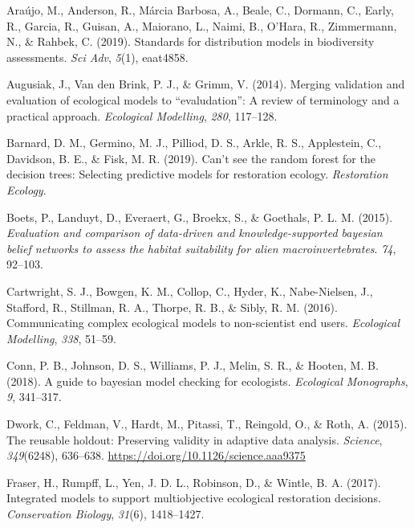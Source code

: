 \documentclass[
]{article}
\newlength{\cslhangindent}
\newenvironment{CSLReferences}[2] %
 {\begin{list}{}{%
  \setlength{\itemindent}{0pt}
  \setlength{\leftmargin}{0pt}
  \setlength{\parsep}{0pt}
  \ifodd #1
   \setlength{\leftmargin}{\cslhangindent}
   \setlength{\itemindent}{-1\cslhangindent}
  \fi
  \setlength{\itemsep}{#2\baselineskip}}}
 {\end{list}}
\begin{document}
\label{refs}
\begin{CSLReferences}{1}{0}
Araújo, M., Anderson, R., Márcia Barbosa, A., Beale, C., Dormann, C.,
Early, R., Garcia, R., Guisan, A., Maiorano, L., Naimi, B., O'Hara, R.,
Zimmermann, N., \& Rahbek, C. (2019). Standards for distribution models
in biodiversity assessments. \emph{Sci Adv}, \emph{5}(1), eaat4858.

Augusiak, J., Van den Brink, P. J., \& Grimm, V. (2014). Merging
validation and evaluation of ecological models to {``evaludation''}: A
review of terminology and a practical approach. \emph{Ecological
Modelling}, \emph{280}, 117--128.

Barnard, D. M., Germino, M. J., Pilliod, D. S., Arkle, R. S.,
Applestein, C., Davidson, B. E., \& Fisk, M. R. (2019). Can't see the
random forest for the decision trees: Selecting predictive models for
restoration ecology. \emph{Restoration Ecology}.

Boets, P., Landuyt, D., Everaert, G., Broekx, S., \& Goethals, P. L. M.
(2015). \emph{Evaluation and comparison of data-driven and
knowledge-supported bayesian belief networks to assess the habitat
suitability for alien macroinvertebrates}. \emph{74}, 92--103.

Cartwright, S. J., Bowgen, K. M., Collop, C., Hyder, K., Nabe-Nielsen,
J., Stafford, R., Stillman, R. A., Thorpe, R. B., \& Sibly, R. M.
(2016). Communicating complex ecological models to non-scientist end
users. \emph{Ecological Modelling}, \emph{338}, 51--59.

Conn, P. B., Johnson, D. S., Williams, P. J., Melin, S. R., \& Hooten,
M. B. (2018). A guide to bayesian model checking for ecologists.
\emph{Ecological Monographs}, \emph{9}, 341--317.

Dwork, C., Feldman, V., Hardt, M., Pitassi, T., Reingold, O., \& Roth,
A. (2015). The reusable holdout: Preserving validity in adaptive data
analysis. \emph{Science}, \emph{349}(6248), 636--638.
\url{https://doi.org/10.1126/science.aaa9375}

Fraser, H., Rumpff, L., Yen, J. D. L., Robinson, D., \& Wintle, B. A.
(2017). Integrated models to support multiobjective ecological
restoration decisions. \emph{Conservation Biology}, \emph{31}(6),
1418--1427.


\end{CSLReferences}
\end{document}

